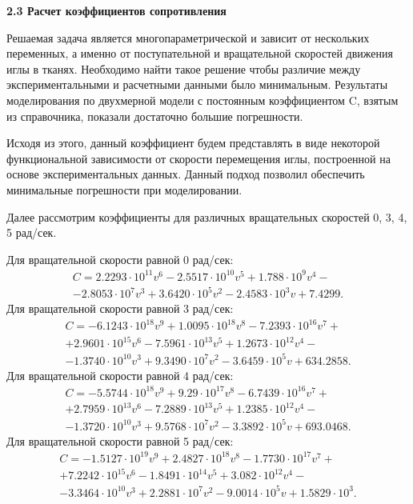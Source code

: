 \documentclass[10pt]{article}
\begin{document}
\bigskip
\textbf{2.3 Расчет коэффициентов сопротивления}

Решаемая задача является многопараметрической и зависит от нескольких переменных, а именно от поступательной и вращательной скоростей движения иглы в тканях. Необходимо найти такое решение чтобы различие между экспериментальными и расчетными данными было минимальным. 
Результаты моделирования по двухмерной модели с постоянным коэффициентом C, взятым из справочника, показали достаточно большие погрешности. 

Исходя из этого, данный коэффициент будем представлять в виде некоторой функциональной зависимости от скорости перемещения иглы, построенной на основе экспериментальных данных.  Данный подход позволил  обеспечить минимальные погрешности при моделировании.

Далее рассмотрим коэффициенты для различных вращательных скоростей 0, 3, 4, 5 рад/сек.  

Для вращательной скорости равной 0 рад/сек:
\begin{multline} \label{eq12}
C= 2.2293\cdot10^{11} v^6 - 2.5517\cdot10^{10} v^5+1.788\cdot10^9 v^4 - \\ -2.8053\cdot10^7 v^3 +3.6420\cdot10^5 v^2-2.4583\cdot10^3 v+7.4299.
\end{multline}
Для вращательной скорости равной 3 рад/сек:
\begin{multline} \label{eq13}
C= -6.1243\cdot10^{18} v^9 + 1.0095\cdot10^{18}v^8 -  7.2393\cdot10^{16} v^7 +\\+ 2.9601\cdot10^{15} v^6 - 7.5961\cdot10^{13} v^5 + 1.2673\cdot10^{12} v^4 - \\-1.3740\cdot10^{10} v^3 + 9.3490\cdot10^7 v^2 - 3.6459\cdot10^5 v+ 634.2858.
\end{multline}
Для вращательной скорости равной 4 рад/сек:
\begin{multline} \label{eq14}
C= -5.5744\cdot10^{18} v^9 + 9.29\cdot10^{17}v^8 -  6.7439\cdot10^{16} v^7 +\\+ 2.7959\cdot10^{13} v^6 - 7.2889\cdot10^{13} v^5 + 1.2385\cdot10^{12} v^4 - \\-1.3720\cdot10^{10} v^3 + 9.5768\cdot10^7 v^2 - 3.3892\cdot10^5 v+ 693.0468.
\end{multline}
Для вращательной скорости равной 5 рад/сек:
\begin{multline} \label{eq15}
C= -1.5127\cdot10^{19} v^9 + 2.4827\cdot10^{18}v^8 -  1.7730\cdot10^{17} v^7 +\\+ 7.2242\cdot10^{15} v^6 - 1.8491\cdot10^{14} v^5 + 3.082\cdot10^{12} v^4 - \\-3.3464\cdot10^{10} v^3 + 2.2881\cdot10^7 v^2 - 9.0014\cdot10^5 v+ 1.5829\cdot10^3.
\end{multline}
\end{document}
